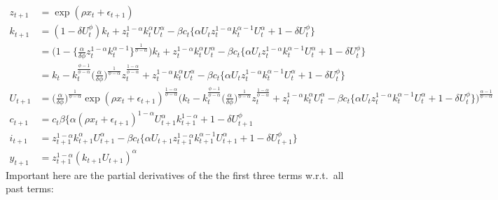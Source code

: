 \documentclass[a4paper]{article}
\theoremstyle{definition}
\begin{document}
	\begin{align*}
	z_{t+1} 	&= \exp(\rho x_t+\epsilon_{t+1}) \\
	k_{t+1}	&= (1-\delta U_t^\phi)k_t + z_{t}^{1-\alpha} k_{t}^{\alpha} U_{t}^{\alpha} - \beta c_t \bigg\{ \alpha U_{t} z_{t}^{1-\alpha} k_{t}^{\alpha-1} U_{t}^{\alpha}+1-\delta U_{t}^{\phi} \bigg\} \\
				&= \bigg( 1- \bigg\{ \frac{\alpha}{\delta\phi} z_t^{1-\alpha} k_t^{\alpha-1} \bigg\}^{\frac{1}{\phi-\alpha}} \bigg)k_t + z_{t}^{1-\alpha} k_{t}^{\alpha} U_{t}^{\alpha} - \beta c_t \bigg\{ \alpha U_{t} z_{t}^{1-\alpha} k_{t}^{\alpha-1} U_{t}^{\alpha}+1-\delta U_{t}^{\phi} \bigg\}  \\
				&= k_t - k_t^{\frac{\phi-1}{\phi-\alpha}} \Big( \frac{\alpha}{\delta\phi} \Big)^{\frac{1}{\phi-\alpha}} z_t^{\frac{1-\alpha}{\phi-\alpha}} + z_{t}^{1-\alpha} k_{t}^{\alpha} U_{t}^{\alpha} - \beta c_t \bigg\{ \alpha U_{t} z_{t}^{1-\alpha} k_{t}^{\alpha-1} U_{t}^{\alpha}+1-\delta U_{t}^{\phi} \bigg\} \\
	U_{t+1}	&= \Big( \frac{\alpha}{\delta\phi} \Big)^{\frac{1}{\phi-\alpha}} \exp(\rho x_t + \epsilon_{t+1})^{\frac{1-\alpha}{\phi-\alpha}} \Big( k_t - k_t^{\frac{\phi-1}{\phi-\alpha}} \Big( \frac{\alpha}{\delta\phi} \Big)^{\frac{1}{\phi-\alpha}} z_t^{\frac{1-\alpha}{\phi-\alpha}} + z_{t}^{1-\alpha} k_{t}^{\alpha} U_{t}^{\alpha} - \beta c_t \bigg\{ \alpha U_{t} z_{t}^{1-\alpha} k_{t}^{\alpha-1} U_{t}^{\alpha}+1-\delta U_{t}^{\phi} \bigg\} \Big)^{\frac{\alpha-1}{\phi-\alpha}} \\
	c_{t+1}	&= c_t \beta \Big\{ \alpha (\rho x_t + \epsilon_{t+1})^{1-\alpha}U_{t+1}^\alpha k_{t+1}^{1-\alpha} + 1 - \delta U_{t+1}^\phi\\
	i_{t+1}	&= z_{t+1}^{1-\alpha} k_{t+1}^{\alpha} U_{t+1}^{\alpha} - \beta c_t \bigg\{ \alpha U_{t+1} z_{t+1}^{1-\alpha} k_{t+1}^{\alpha-1} U_{t+1}^{\alpha}+1-\delta U_{t+1}^{\phi} \bigg\} \\
	y_{t+1}	&= z_{t+1}^{1-\alpha} (k_{t+1}U_{t+1})^\alpha
	\end{align*}
Important here are the partial derivatives of the the first three terms w.r.t.\ all past terms:
\end{document}
